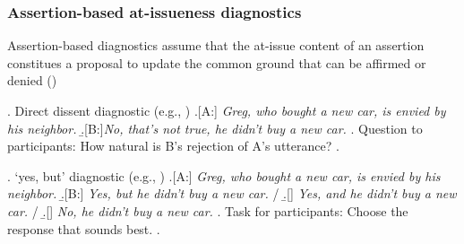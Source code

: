 \documentclass[compress, xcolor = dvipsnames, aspectratio=169]{beamer}
\begin{document}
	\begin{frame}[t]\frametitle{Assertion-based at-issueness diagnostics}\small

		Assertion-based diagnostics assume that the at-issue content of an assertion constitues a proposal to update the common ground that can be affirmed or denied (\citealt{farkas_reacting_2010,murray_varieties_2014,anderbois_at-issue_2015})\pause

		  \ex. \label{dd} Direct dissent diagnostic (e.g., \citealt{tonhauser_diagnosing_2012,syrett_experimental_2015})
		    \a.[A:] \emph{Greg, who bought a new car, is envied by his neighbor.}
		    \b.[B:]\emph{No, that's not true, he didn't buy a new car.}
		    \z.
		  Question to participants: How natural is B's rejection of A's utterance?\pause
		  \z.
		  \vspace{-1.5\baselineskip}

		  \ex. \label{yesbut}%
		    `yes, but' diagnostic (e.g., \citealt{xue_correlation_2011,destruel_cross-linguistic_2015})
		    \a.[A:] \emph{Greg, who bought a new car, is envied by his neighbor.}
		    \b.[B:] \emph{Yes, but he didn't buy a new car.} /
		    \b.[] \emph{Yes, and he didn't buy a new car.} /
		    \b.[] \emph{No, he didn't buy a new car.}
		    \z.
		    Task for participants: Choose the response that sounds best.
		  \z.

	
	\end{frame}
\end{document}
